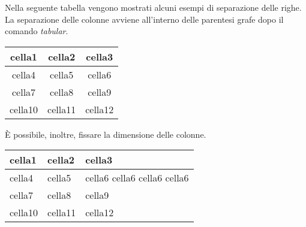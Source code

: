 Nella seguente tabella vengono mostrati alcuni esempi di separazione delle righe. La separazione delle colonne avviene  all'interno delle parentesi grafe dopo il comando \textit{tabular}.
\begin{center}
\begin{tabular}{ ||c|c|c|| } 
 \hline
 cella1 & cella2 & cella3 \\
 \hline\hline 
 cella4 & cella5 & cella6 \\ 
 \hline
 cella7 & cella8 & cella9 \\ 
 cella10 & cella11 & cella12 \\ 
 \hline
\end{tabular}
\end{center}

È possibile, inoltre, fissare la dimensione delle colonne.

\begin{center}
\begin{tabular}{ | m{3cm} | m{5cm} | m{1.5cm} | } 
 \hline
 cella1 & cella2 & cella3 \\
 \hline\hline 
 cella4 & cella5 & cella6 cella6 cella6 cella6 \\ 
 \hline
 cella7 & cella8 & cella9 \\ 
 cella10 & cella11 & cella12 \\ 
 \hline
\end{tabular}
\end{center}